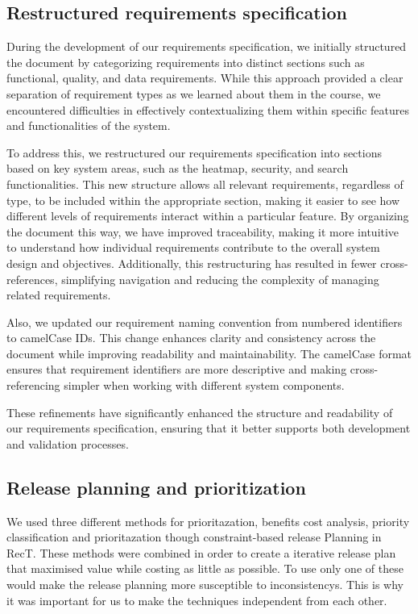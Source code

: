 \subsection{Restructured requirements specification}
During the development of our requirements specification, we initially structured the document by categorizing requirements into distinct sections such as functional, quality, and data requirements. While this approach provided a clear separation of requirement types as we learned about them in the course, we encountered difficulties in effectively contextualizing them within specific features and functionalities of the system.

To address this, we restructured our requirements specification into sections based on key system areas, such as the heatmap, security, and search functionalities. This new structure allows all relevant requirements, regardless of type, to be included within the appropriate section, making it easier to see how different levels of requirements interact within a particular feature. By organizing the document this way, we have improved traceability, making it more intuitive to understand how individual requirements contribute to the overall system design and objectives. Additionally, this restructuring has resulted in fewer cross-references, simplifying navigation and reducing the complexity of managing related requirements.

Also, we updated our requirement naming convention from numbered identifiers to camelCase IDs. This change enhances clarity and consistency across the document while improving readability and maintainability. The camelCase format ensures that requirement identifiers are more descriptive and making cross-referencing simpler when working with different system components.

These refinements have significantly enhanced the structure and readability of our requirements specification, ensuring that it better supports both development and validation processes.

\subsection{Release planning and prioritization}

We used three different methods for prioritazation, benefits cost analysis, priority classification and prioritazation though constraint-based release Planning in RecT. These methods were combined in order to create a iterative release plan that maximised value while costing as little as possible. To use only one of these would make the release planning more susceptible to inconsistencys. This is why it was important for us to make the techniques independent from each other.

